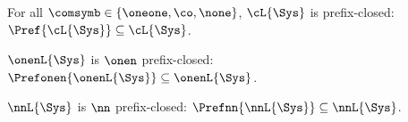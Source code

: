 \begin{proposition}
	For all $\comsymb \in \{\oneone, \co, \none\}$, $\cL{\Sys}$ is prefix-closed:
	$\Pref{\cL{\Sys}} \subseteq \cL{\Sys}$.
\end{proposition}

\begin{proposition}
	$\onenL{\Sys}$ is $\onen$ prefix-closed:
	$\Prefonen{\onenL{\Sys}} \subseteq \onenL{\Sys}$.
\end{proposition}
\begin{proposition}
	$\nnL{\Sys}$ is $\nn$ prefix-closed:
	$\Prefnn{\nnL{\Sys}} \subseteq \nnL{\Sys}$.
\end{proposition}

\begin{comment}

Lemma~\ref{lem:prefix-closed} can be easily extendend to $\comsymb = \cosymb$.

\begin{lemma}\label{lem:co-prefix-closed}
	For all $\comsymb \in \{\ppsymb, \mbsymb, \cosymb\}$, $\cL{\Sys}$ is prefix-closed:
	$\Pref{\cL{\Sys}} \subseteq \cL{\Sys}$.
\end{lemma}
\begin{proof}
	Follows from Lemma~\ref{lem:co-prefix}.
\end{proof}

\begin{lemma}\label{lem:onen-prefix-closed}
	$\onenL{\Sys}$ is $\onen$ prefix-closed:
	$\Prefonen{\onenL{\Sys}} \subseteq \onenL{\Sys}$.
\end{lemma}
\begin{proof}
	Given a system $\System$, we have that $\onenL{\System} = \ppL{\System} \cap \onenMSCs$. Note that, because of how we defined a $\onen$ prefix, we have that $\Prefonen{\onenL{\Sys}} = \Pref{\onenL{\Sys}} \cap \onenMSCs$. Moreover, $\Pref{\onenL{\Sys}} \subseteq \Pref{\ppL{\Sys}}$, and $\Pref{\onenL{\Sys}} \subseteq \ppL{\Sys}$ for Lemma~\ref{lem:prefix-closed}. Putting everything together, $\Prefonen{\onenL{\Sys}} \subseteq \ppL{\Sys} \cap \onenMSCs = \onenL{\System}$.
\end{proof}

\begin{lemma}\label{lem:nn-prefix-closed}
	$\nnL{\Sys}$ is $\nn$ prefix-closed:
	$\Prefnn{\nnL{\Sys}} \subseteq \nnL{\Sys}$.
\end{lemma}
\begin{proof}
	Given a system $\System$, we have that $\nnL{\System} = \ppL{\System} \cap \nnMSCs$. Note that, because of how we defined a $\nn$ prefix, we have that $\Prefnn{\nnL{\Sys}} = \Pref{\nnL{\Sys}} \cap \nnMSCs$. Moreover, $\Pref{\nnL{\Sys}} \subseteq \Pref{\ppL{\Sys}}$, and $\Pref{\nnL{\Sys}} \subseteq \ppL{\Sys}$ for Lemma~\ref{lem:prefix-closed}. Putting everything together, $\Prefnn{\nnL{\Sys}} \subseteq \ppL{\Sys} \cap \nnMSCs = \nnL{\System}$.
\end{proof}

\end{comment}


